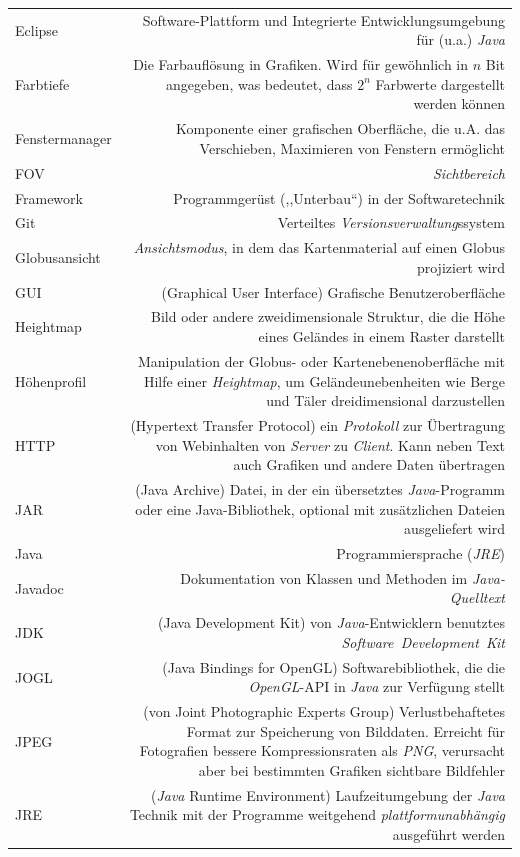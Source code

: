 \documentclass[10pt]{scrreprt}
\newcommand{\textref}[1]{\mbox{\raisebox{0.1ex}{\small$\rightarrow$ }\textit{#1}}}
\begin{document}
\begin{longtabu}{L{0.35} R{1.65}}
Eclipse & Software-Plattform und Integrierte Entwicklungsumgebung für (u.a.) \textref{Java}\\
Farbtiefe & Die Farbauflösung in Grafiken. Wird für gewöhnlich in $n$ Bit angegeben, was bedeutet, dass $2^n$ Farbwerte dargestellt werden können\\
Fenstermanager & Komponente einer grafischen Oberfläche, die u.A. das Verschieben, Maximieren von Fenstern ermöglicht\\
FOV & \textref{Sichtbereich}\\
Framework & Programmgerüst (,,Unterbau``) in der Softwaretechnik \\
Git & Verteiltes \textref{Versionsverwaltung}ssystem\\
Globusansicht & \textref{Ansichtsmodus}, in dem das Kartenmaterial auf einen Globus projiziert wird\\
GUI& (Graphical User Interface) Grafische Benutzeroberfläche\\
Heightmap & Bild oder andere zweidimensionale Struktur, die die Höhe eines Geländes in einem Raster darstellt\\
Höhenprofil & Manipulation der Globus- oder Kartenebenenoberfläche mit Hilfe einer \textref{Heightmap}, um Geländeunebenheiten wie Berge und Täler dreidimensional darzustellen\\
HTTP & (Hypertext Transfer Protocol) ein \textref{Protokoll} zur Übertragung von Webinhalten von \textref{Server} zu \textref{Client}. Kann neben Text auch Grafiken und andere Daten übertragen\\
JAR & (Java Archive) Datei, in der ein übersetztes \textref{Java}-Programm oder eine Java-Bibliothek, optional mit zusätzlichen Dateien ausgeliefert wird\\
Java & Programmiersprache (\textref{JRE})\\
Javadoc & Dokumentation von Klassen und Methoden im \textref{Java-Quelltext}\\
JDK & (Java Development Kit) von \textref{Java}-Entwicklern benutztes \textref{Software Development Kit}\\
JOGL & (Java Bindings for OpenGL) Softwarebibliothek, die die \textref{OpenGL}-API in \textref{Java} zur Verfügung stellt\\
JPEG & (von Joint Photographic Experts Group) Verlustbehaftetes Format zur Speicherung von Bilddaten. Erreicht für Fotografien bessere Kompressionsraten als \textref{PNG}, verursacht aber bei bestimmten Grafiken sichtbare Bildfehler\\
JRE & (\textref{Java} Runtime Environment) Laufzeitumgebung der \textref{Java} Technik mit der Programme weitgehend \textref{plattformunabhängig} ausgeführt werden\\

\end{longtabu}
\end{document}
